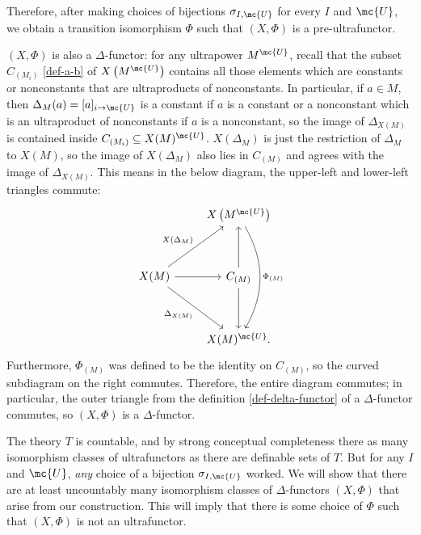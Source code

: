       Therefore, after making choices of bijections $\sigma_{I, \mc{U}}$ for every $I$ and $\mc{U}$, we obtain a transition isomorphism $\Phi$ such that $(X,\Phi)$ is a pre-ultrafunctor.

      $(X,\Phi)$ is also a $\Delta$-functor: for any ultrapower $M^{\mc{U}}$, recall that the subset $C_{(M_i)}$ \ref{def-a-b} of $X\left(M^{\mc{U}}\right)$ contains all those elements which are constants or nonconstants that are ultraproducts of nonconstants. In particular, if $a \in M$, then $\Delta_M(a) = [a]_{i \to \mc{U}}$ is a constant if $a$ is a constant or a nonconstant which is an ultraproduct of nonconstants if $a$ is a nonconstant, so the image of $\Delta_{X(M)}$ is contained inside $C_{(M_i)} \subseteq X(M)^{\mc{U}}$. $X(\Delta_M)$ is just the restriction of $\Delta_M$ to $X(M)$, so the image of $X(\Delta_M)$ also lies in $C_{(M)}$ and agrees with the image of $\Delta_{X(M)}$. This means in the below diagram, the upper-left and lower-left triangles commute:
      $$
      \begin{tikzcd}[ampersand replacement = \&]
         \& X\left(M^{\mc{U}}\right) \arrow[bend left]{dddd}{\Phi_{(M)}}\\
         \&  \\
       X(M) \arrow{r} \arrow[swap]{ddr}{\Delta_{X(M)}} \arrow{uur}{X \left(\Delta_M\right)}  \& C_{(M)} \arrow{uu} \arrow{dd}\\
       \& \\
       \& X(M)^{\mc{U}}.
        \end{tikzcd}
        $$
         Furthermore, $\Phi_{(M)}$ was defined to be the identity on $C_{(M)}$, so the curved subdiagram on the right commutes. Therefore, the entire diagram commutes; in particular, the outer triangle from the definition \ref{def-delta-functor} of a $\Delta$-functor commutes, so $(X,\Phi)$ is a $\Delta$-functor.

         The theory $T$ is countable, and by strong conceptual completeness there as many isomorphism classes of ultrafunctors as there are definable sets of $T$. But for any $I$ and $\mc{U}$, \emph{any} choice of a bijection $\sigma_{I, \mc{U}}$ worked. We will show that there are at least uncountably many isomorphism classes of $\Delta$-functors $(X,\Phi)$ that arise from our construction. This will imply that there is some choice of $\Phi$ such that $(X, \Phi)$ is not an ultrafunctor.

